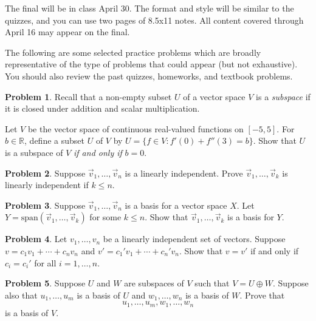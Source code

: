 \documentclass[12pt]{article}
\theoremstyle{definition}
\newtheorem{problem}{Problem}
\begin{document}
    \textbf{\Large{}}
    
    \vspace{-1.8em}
    \hrulefill
\vspace{.25em} 

The final will be in class April 30. 
The format and style will be similar to the quizzes, and you can use two pages of 8.5x11 notes.
All content covered through April 16 may appear on the final.

The following are some selected practice problems which are broadly representative of the type of problems that could appear (but not exhaustive).
You should also review the past quizzes, homeworks, and textbook problems.

\begin{problem}
    Recall that a non-empty subset $U$ of a vector space $V$ is a \emph{subspace} if it is closed under addition and scalar multiplication. 
    
    Let $V$ be the vector space of continuous real-valued functions on $[-5,5]$. 
    For $b\in \mathbb{R}$, define a subset $U$ of $V$ by $U = \{ f \in V : f'(0) + f''(3) = b \}$.
    Show that $U$ is a subspace of $V$ \emph{if and only if} $b=0$.
\end{problem}

\begin{problem}
    Suppose $\vec{v}_1, \ldots, \vec{v}_n$ is a linearly independent.
    Prove $\vec{v}_1, \ldots, \vec{v}_k$ is linearly independent if $k\leq n$.
\end{problem}


\begin{problem}
    Suppose $\vec{v}_1, \ldots, \vec{v}_n$ is a basis for a vector space $X$. 
    Let $Y = \text{span}(\vec{v}_1, \ldots, \vec{v}_k)$ for some $k \leq n$.
    Show that $\vec{v}_{1}, \ldots, \vec{v}_k$ is a basis for $Y$.
\end{problem}

\begin{problem}
    Let $v_1, \ldots, v_n$ be a linearly independent set of vectors. Suppose $v = c_1 v_1 + \cdots + c_n v_n$ and $v' = c_1' v_1 + \cdots + c_n' v_n$.
    Show that $v = v'$ if and only if $c_i = c_i'$ for all $i=1,\ldots,n$.
\end{problem}

\begin{problem}
    Suppose $U$ and $W$ are subspaces of $V$ such that $V=U \oplus W$. Suppose also that $u_1, \ldots, u_m$ is a basis of $U$ and $w_1, \ldots, w_n$ is a basis of $W$. Prove that
    \[
    u_1, \ldots, u_m, w_1, \ldots, w_n
    \]
    is a basis of $V$.
\end{problem}
\end{document}
